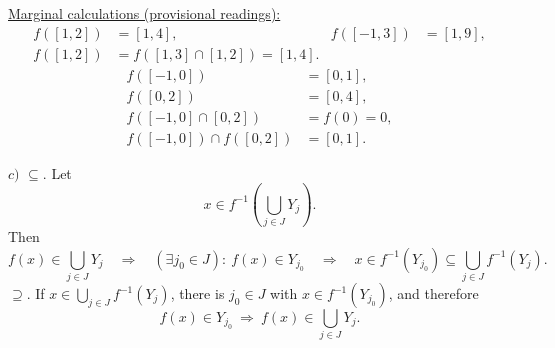 \begin{center}
\end{center}

\noindent\underline{Marginal calculations (provisional readings):}
\[
\begin{aligned}
 f([1,2])&=[1,4], & f([-1,3])&=[1,9],\\
 f([1,2])&=f([1,3]\cap[1,2])=[1,4].
\end{aligned}
\]
\[
\boxed{\begin{aligned}
 f([-1,0])&=[0,1],\\
 f([0,2])&=[0,4],\\
 f([-1,0]\cap[0,2])&=f(0)=0,\\
 f([-1,0])\cap f([0,2])&=[0,1].
\end{aligned}}
\]

\medskip
\noindent $c)$ \underline{$\subseteq$}.
Let
\[
 x\in f^{-1}\left(\bigcup_{j\in J}Y_j\right).
\]
\noindent Then
\[
 f(x)\in\bigcup_{j\in J}Y_j
 \quad\Longrightarrow\quad
 (\exists j_0\in J):\ f(x)\in Y_{j_0}
 \quad\Longrightarrow\quad
 x\in f^{-1}(Y_{j_0})
 \subseteq\bigcup_{j\in J}f^{-1}(Y_j).
\]
\noindent \underline{$\supseteq$}.
If $x\in\bigcup_{j\in J}f^{-1}(Y_j)$, there is $j_0\in J$
with $x\in f^{-1}(Y_{j_0})$, and therefore
\[
 f(x)\in Y_{j_0}\ \Longrightarrow\ f(x)\in\bigcup_{j\in J}Y_j.
\]
